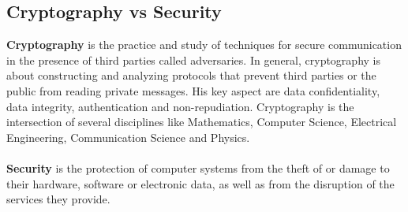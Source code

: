 \documentclass[11pt]{article}
\begin{document}
\subsection{Cryptography vs Security}
\textbf{Cryptography} is the practice and study of techniques for secure communication in the presence of third parties called adversaries. In general, cryptography is about constructing and analyzing protocols that prevent third parties or the public from reading private messages. His key aspect are data confidentiality, data integrity, authentication and non-repudiation. Cryptography is the intersection of several disciplines like Mathematics, Computer Science, Electrical Engineering, Communication Science and Physics.\\\\\textbf{Security} is the protection of computer systems from the theft of or damage to their hardware, software or electronic data, as well as from the disruption of the services they provide.
\end{document}

